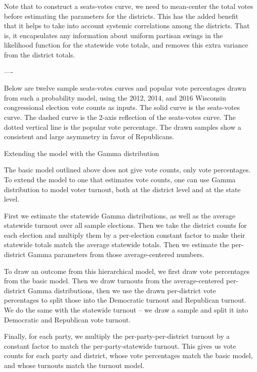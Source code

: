 \documentclass[preprint,12pt]{article}
\begin{document}
Note that to construct a seats-votes curve, we need to mean-center the total votes before estimating the parameters for the districts.  This has the added benefit that it helps to take into account systemic correlations among the districts.  That is, it encapsulates any information about uniform partisan swings in the likelihood function for the statewide vote totals, and removes this extra variance from the district totals.
 
----
 
Below are twelve sample seats-votes curves and popular vote percentages drawn from such a probability model, using the 2012, 2014, and 2016 Wisconsin congressional election vote counts as inputs.  The solid curve is the seats-votes curve.  The dashed curve is the 2-axis reflection of the seats-votes curve.  The dotted vertical line is the popular vote percentage.  The drawn samples show a consistent and large asymmetry in favor of Republicans.

 
 
Extending the model with the Gamma distribution
 
The basic model outlined above does not give vote counts, only vote percentages.  To extend the model to one that estimates vote counts, one can use Gamma distribution to model voter turnout, both at the district level and at the state level.
 
First we estimate the statewide Gamma distributions, as well as the average statewide turnout over all sample elections.   Then we take the district counts for each election and multiply them by a per-election constant factor to make their statewide totals match the average statewide totals.  Then we estimate the per-district Gamma parameters from those average-centered numbers.
 
To draw an outcome from this hierarchical model, we first draw vote percentages from the basic model. Then we draw turnouts from the average-centered per-district Gamma distributions, then we use the drawn per-district vote percentages to split those into the Democratic turnout and Republican turnout.  We do the same with the statewide turnout -- we draw a sample and split it into Democratic and Republican vote turnout. 
 
Finally, for each party, we multiply the per-party-per-district turnout by a constant factor to match the per-party-statewide turnout.  This gives us vote counts for each party and district, whose vote percentages match the basic model, and whose turnouts match the turnout model.
 
\end{document}
